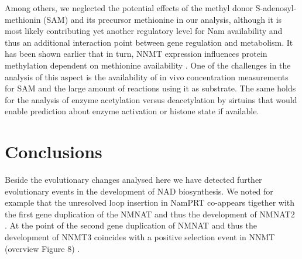 Among others, we neglected the potential effects of the methyl donor S-adenosyl-methionin (SAM) and its precursor methionine in our analysis, although it is most likely contributing yet another regulatory level for Nam availability and thus an additional interaction point between gene regulation and metabolism. It has been shown earlier that in turn, NNMT expression influences protein methylation dependent on methionine availability \cite{Ulanovskaya2013}. One of the challenges in the analysis of this aspect is the availability of in vivo concentration measurements for SAM and the large amount of reactions using it as substrate. The same holds for the analysis of enzyme acetylation versus deacetylation by sirtuins that would enable prediction about enzyme activation or histone state if available.


\section{Conclusions}

Beside the evolutionary changes analysed here we have detected further evolutionary events in the development of NAD biosynthesis. We noted for example that the unresolved loop insertion in NamPRT co-appears tigether with the first gene duplication of the NMNAT and thus the development of NMNAT2 \cite{Lau2010}. At the point of the second gene duplication of NMNAT and thus the development of NNMT3 coincides with a positive selection event in NNMT (overview Figure 8) .